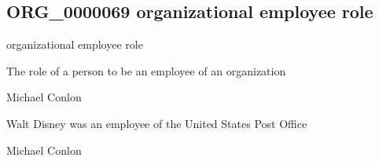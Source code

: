 \documentclass[letterpaper,10pt,english]{sphinxmanual}
\begin{document}
\subsection{ORG\_0000069 \sphinxhyphen{} organizational employee role}
\label{\detokenize{doc-ORG_0000069:org-0000069-organizational-employee-role}}\label{\detokenize{doc-ORG_0000069:index-0}}\label{\detokenize{doc-ORG_0000069::doc}}
\begin{sphinxShadowBox}

\sphinxAtStartPar
organizational employee role
\end{sphinxShadowBox}

\begin{sphinxShadowBox}

\sphinxAtStartPar
{\hyperref[\detokenize{doc-BFO_0000023::doc}]{}}
\end{sphinxShadowBox}

\begin{sphinxShadowBox}

\sphinxAtStartPar
The role of a person to be an employee of an organization
\end{sphinxShadowBox}

\begin{sphinxShadowBox}

\sphinxAtStartPar
Michael Conlon 
\end{sphinxShadowBox}

\begin{sphinxShadowBox}

\sphinxAtStartPar
Walt Disney was an employee of the United States Post Office
\end{sphinxShadowBox}

\begin{sphinxShadowBox}

\sphinxAtStartPar
Michael Conlon 
\end{sphinxShadowBox}
\begin{quote}

\ignorespaces \end{quote}
\end{document}
